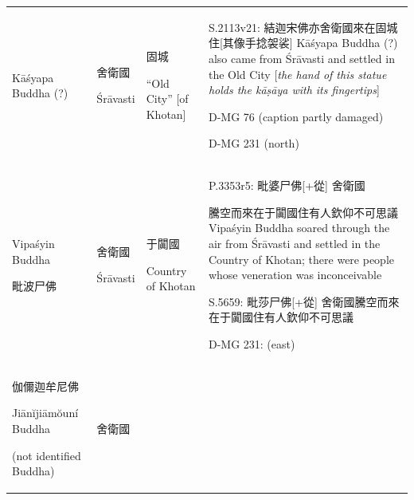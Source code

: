 \documentclass[
  english,
  a4paper,
  DIV=12,
  footlines=2.1,
  usegeometry=true]{scrartcl}
\begin{document}
\begin{longtable}[]{@{}llll@{}}
\begin{minipage}[t]{0.18\columnwidth}
Kāśyapa Buddha (?)\strut
\end{minipage} & \begin{minipage}[t]{0.13\columnwidth}\raggedright
舍衛國

Śrāvasti\strut
\end{minipage} & \begin{minipage}[t]{0.13\columnwidth}\raggedright
固城

``Old City'' {[}of Khotan{]}\strut
\end{minipage} & \begin{minipage}[t]{0.44\columnwidth}\raggedright
S.2113v21: 結迦宋佛亦舍衛國來在固城住{[}其像手捻袈裟{]} Kāśyapa Buddha
(?) also came from Śrāvasti and settled in the Old City {[}\emph{the
hand of this statue holds the kāṣāya with its fingertips}{]}

D-MG 76 (caption partly damaged)

D-MG 231 (north)\strut
\end{minipage}\tabularnewline
\begin{minipage}[t]{0.18\columnwidth}\raggedright
Vipaśyin Buddha

毗波尸佛\strut
\end{minipage} & \begin{minipage}[t]{0.13\columnwidth}\raggedright
舍衛國

Śrāvasti\strut
\end{minipage} & \begin{minipage}[t]{0.13\columnwidth}\raggedright
于闐國

Country of Khotan\strut
\end{minipage} & \begin{minipage}[t]{0.44\columnwidth}\raggedright
P.3353r5: 毗婆尸佛{[}+從{]} 舍衛國

騰空而來在于闐國住有人欽仰不可思議 Vipaśyin Buddha soared through the
air from Śrāvasti and settled in the Country of Khotan; there were
people whose veneration was inconceivable

S.5659: 毗莎尸佛{[}+從{]} 舍衛國騰空而來在于闐國住有人欽仰不可思議

D-MG 231: (east)\strut
\end{minipage}\tabularnewline
\begin{minipage}[t]{0.18\columnwidth}\raggedright
伽儞迦牟尼佛

Jiānĭjiāmŏuní Buddha

(not identified Buddha)\strut
\end{minipage} & \begin{minipage}[t]{0.13\columnwidth}\raggedright
舍衛國


\end{minipage}
\end{longtable}
\end{document}
